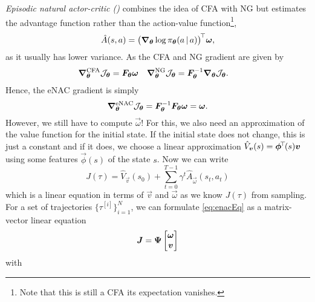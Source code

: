 			\emph{Episodic natural actor-critic ()} combines the idea of \ac{CFA} with \ac{NG} but estimates the advantage function rather than the action-value function\footnote{Note that this is still a \ac{CFA} its expectation vanishes.},
			\begin{equation}
				\hat{A}(s, a) = \bigl( \grad_{\bm{\theta}} \log \pi_{\bm{\theta}}(a \,\vert\, a) \bigr)^{{\!\top\!}\,} \bm{\omega},
			\end{equation}
			as it usually has lower variance. As the \ac{CFA} and \ac{NG} gradient are given by
			\begin{align}
				\grad_{\bm{\theta}}^\mathrm{CFA} \mathcal{J}_{\bm{\theta}} & = \bm{F}_{\bm{\theta}} \bm{\omega}                                          &
				\grad_{\bm{\theta}}^\mathrm{NG} \mathcal{J}_{\bm{\theta}}  & = \bm{F}_{\bm{\theta}}^{-1} \grad_{\bm{\theta}} \mathcal{J}_{\bm{\theta}}.
			\end{align}
			Hence, the \ac{eNAC} gradient is simply
			\begin{equation}
				\grad_{\bm{\theta}}^\mathrm{eNAC} \mathcal{J}_{\bm{\theta}}
				= \bm{F}_{\bm{\theta}}^{-1} \bm{F}_{\bm{\theta}} \bm{\omega}
				= \bm{\omega}.
			\end{equation}
			However, we still have to compute \(\vec{\omega}\)! For this, we also need an approximation of the value function for the initial state. If the initial state does not change, this is just a constant and if it does, we choose a linear approximation \( \hat{V}_{\bm{v}}(s) = \bm{\phi}^{\!\top\!}(s) \bm{v} \) using some features \(\vec{\phi}(s)\) of the state \(s\). Now we can write
			\begin{equation}
				J(\tau) = \hat{V}_{\vec{v}}(s_0) + \sum_{t = 0}^{T - 1} \gamma^t \hat{A}_{\vec{\omega}}(s_t, a_t)  \label{eq:enacEq}
			\end{equation}
			which is a linear equation in terms of \(\vec{v}\) and \(\vec{\omega}\) as we know \(J(\tau)\) from sampling. For a set of trajectories \( \bigl\{ \tau^{[i]} \bigr\}_{i = 1}^{N} \), we can formulate \eqref{eq:enacEq} as a matrix-vector linear equation
			\begin{equation}
				\bm{J} = \bm{\Psi} \begin{bmatrix} \bm{\omega} \\ \bm{v} \end{bmatrix}
			\end{equation}
			with
